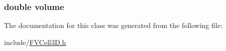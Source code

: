 \label{d0/ded/classFVCell3D_a7fe38788ed0792b47203a4fb432f523a}
\hypertarget{classFVCell3D_a8eb3ef4958b442309868039dbab6f0bf}{
\subsubsection[{volume}]{\setlength{\rightskip}{0pt plus 5cm}double {\bf volume}}}
\label{d0/ded/classFVCell3D_a8eb3ef4958b442309868039dbab6f0bf}


The documentation for this class was generated from the following file:\begin{DoxyCompactItemize}
\item 
include/\hyperlink{FVCell3D_8h}{FVCell3D.h}\end{DoxyCompactItemize}
